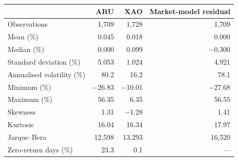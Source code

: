 \begin{tabular}{@{}lrrr@{}}
\toprule
 & ARU & XAO & Market-model residual \\
\midrule
Observations & 1{,}709 & 1{,}728 & 1{,}709 \\
Mean (\%) & 0.045 & 0.018 & 0.000 \\
Median (\%) & 0.000 & 0.099 & $-$0.300 \\
Standard deviation (\%) & 5.053 & 1.024 & 4.921 \\
Annualised volatility (\%) & 80.2 & 16.2 & 78.1 \\
Minimum (\%) & $-$26.83 & $-$10.01 & $-$27.68 \\
Maximum (\%) & 56.35 & 6.35 & 56.55 \\
Skewness & 1.31 & $-$1.28 & 1.41 \\
Kurtosis & 16.04 & 16.34 & 17.97 \\
Jarque--Bera & 12{,}598 & 13{,}293 & 16{,}520 \\
Zero-return days (\%) & 23.3 & 0.1 & --- \\
\bottomrule
\end{tabular}
